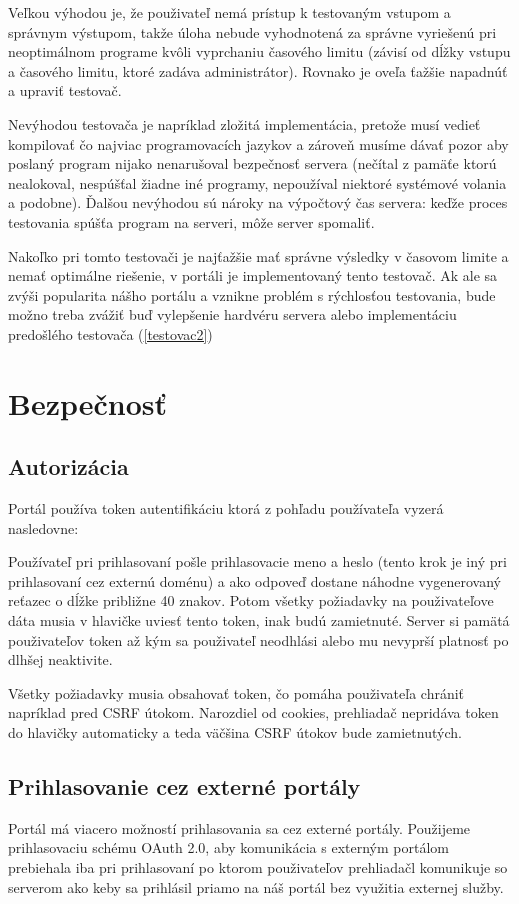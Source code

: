 Veľkou výhodou je, že použivateľ nemá prístup k testovaným vstupom a správnym výstupom, takže úloha nebude vyhodnotená za správne vyriešenú pri neoptimálnom programe kvôli vyprchaniu časového limitu (závisí od dĺžky vstupu a časového limitu, ktoré zadáva administrátor). Rovnako je oveľa ťažšie napadnúť a upraviť testovač.

Nevýhodou testovača je napríklad zložitá implementácia, pretože musí vedieť kompilovať čo najviac programovacích jazykov a zároveň musíme dávať pozor aby poslaný program nijako nenarušoval bezpečnosť servera (nečítal z pamäťe ktorú nealokoval, nespúšťal žiadne iné programy, nepoužíval niektoré systémové volania a podobne). Ďalšou nevýhodou sú nároky na výpočtový čas servera: keďže proces testovania spúšťa program na serveri, môže server spomaliť.

Nakoľko pri tomto testovači je najťažšie mať správne výsledky v časovom limite a nemať optimálne riešenie, v portáli je implementovaný tento testovač. Ak ale sa zvýši popularita nášho portálu a vznikne problém s rýchlosťou testovania, bude možno treba zvážiť buď vylepšenie hardvéru servera alebo implementáciu predošlého testovača (\ref{testovac2})

\section{Bezpečnosť}
\subsection{Autorizácia}
Portál používa token autentifikáciu ktorá z pohľadu používateľa vyzerá nasledovne:

Používateľ pri prihlasovaní pošle prihlasovacie meno a heslo (tento krok je iný pri prihlasovaní cez externú doménu) a ako odpoveď
dostane náhodne vygenerovaný reťazec o dĺžke približne 40 znakov. Potom všetky požiadavky na použivateľove dáta
 musia v hlavičke uviesť tento token, inak budú zamietnuté.
Server si pamätá použivateľov token až kým sa použivateľ neodhlási alebo mu nevyprší platnosť po dlhšej neaktivite.

Všetky požiadavky musia obsahovať token, čo pomáha použivateľa chrániť napríklad pred CSRF útokom. Narozdiel od cookies,
prehliadač nepridáva token do hlavičky automaticky a teda väčšina CSRF útokov bude zamietnutých.

\subsection{Prihlasovanie cez externé portály}
Portál má viacero možností prihlasovania sa cez externé portály. Použijeme prihlasovaciu schému OAuth 2.0, aby komunikácia s externým
portálom prebiehala iba pri prihlasovaní po ktorom použivateľov prehliadačl komunikuje so serverom ako keby sa prihlásil priamo na náš portál bez využitia externej služby.

